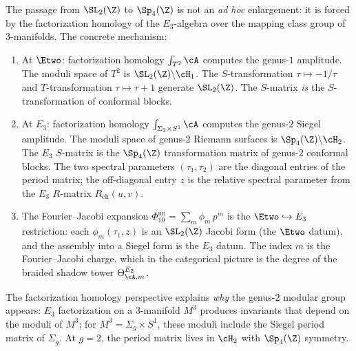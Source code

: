 \begin{remark}
\label{rem:e2-e3-modular-promotion}
The passage from $\SL_2(\Z)$ to $\Sp_4(\Z)$ is not an \emph{ad hoc}
enlargement: it is forced by the factorization homology of the
$E_3$-algebra over the mapping class group of $3$-manifolds. The
concrete mechanism:
\begin{enumerate}[label=\textup{(\alph*)}]
 \item At $\Etwo$: factorization homology $\int_{T^2} \cA$ computes
 the genus-$1$ amplitude. The moduli space of $T^2$ is
 $\SL_2(\Z) \backslash \cH_1$. The $S$-transformation $\tau \mapsto
 -1/\tau$ and $T$-transformation $\tau \mapsto \tau + 1$ generate
 $\SL_2(\Z)$. The $S$-matrix \emph{is} the $S$-transformation of
 conformal blocks.
 \item At $E_3$: factorization homology $\int_{\Sigma_2 \times S^1} \cA$
 computes the genus-$2$ Siegel amplitude. The moduli space of
 genus-$2$ Riemann surfaces is $\Sp_4(\Z) \backslash \cH_2$.
 The $E_3$ $S$-matrix is the $\Sp_4(\Z)$ transformation matrix
 of genus-$2$ conformal blocks. The two spectral parameters
 $(\tau_1, \tau_2)$ are the diagonal entries of the period matrix;
 the off-diagonal entry $z$ is the relative spectral parameter
 from the $E_3$ $R$-matrix $R_{\mathrm{ch}}(u,v)$.
 \item The Fourier--Jacobi expansion
 $\Phi_{10}^{\mathrm{un}} = \sum_m \phi_m\, p^m$
 is the $\Etwo \hookrightarrow E_3$ restriction: each
 $\phi_m(\tau_1, z)$ is an $\SL_2(\Z)$ Jacobi form (the $\Etwo$
 datum), and the assembly into a Siegel form is the $E_3$ datum.
 The index $m$ is the Fourier--Jacobi charge, which in the
 categorical picture is the degree of the braided shadow tower
 $\Theta^{E_2}_{\cA, m}$.
\end{enumerate}
The factorization homology perspective explains \emph{why} the
genus-$2$ modular group appears: $E_3$ factorization on a
$3$-manifold $M^3$ produces invariants that depend on the moduli of
$M^3$; for $M^3 = \Sigma_g \times S^1$, these moduli include the
Siegel period matrix of $\Sigma_g$. At $g = 2$, the period matrix
lives in $\cH_2$ with $\Sp_4(\Z)$ symmetry.
\end{remark}

